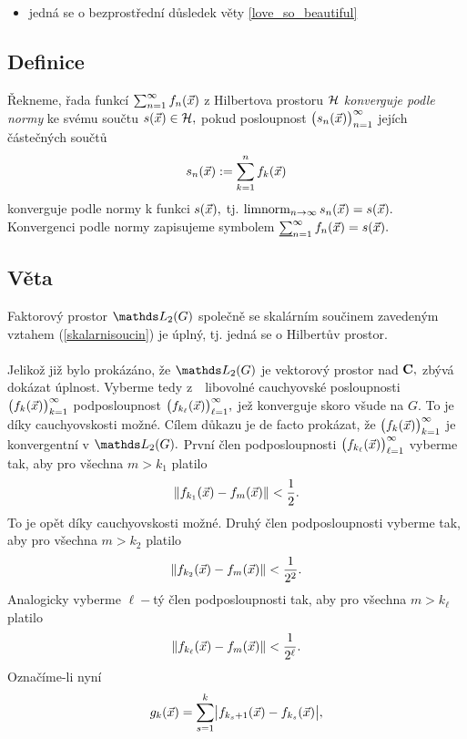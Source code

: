 \Proof

\begin{itemize}
\item jedn\'a se o bezprost\v redn\'i d\r usledek v\v ety \ref{love_so_beautiful}
\end{itemize}

\subsection{Definice}\label{kosta}

\v Rekneme, \v rada funkc\'i $\sum_{n=1}^\infty f_n({\vec{x}})$ z Hilbertova prostoru ${\mathcal H}$ \emph{konverguje podle normy} ke sv\'emu sou\v ctu $s({\vec{x}})\in{\mathcal H},$ pokud posloupnost  $\bigl(s_n({\vec{x}})\bigr)_{n=1}^\infty$ jej\'ich \v c\'aste\v cn\'ych sou\v ct\r u
%
$$s_n({\vec{x}}):=\sum_{k=1}^n f_k({\vec{x}})$$
%
konverguje podle normy k funkci $s({\vec{x}}),$ tj. $\mathop{\mathrm{limnorm}}_{n\rightarrow \infty} s_n({\vec{x}})=s({\vec{x}}).$ Konvergenci podle normy zapisujeme symbolem $\sumline_{n=1}^\infty f_n(\x) = s(\x).$ 



\subsection{V\v eta}

Faktorov\'y prostor $\LL_2(G)$ spole\v cn\v e se skal\'arn\'im
sou\v cinem zaveden\'ym vztahem (\ref{skalarnisoucin}) je \'upln\'y, tj. jedn\'a se o Hilbert\r uv prostor.\\

\Proof\\

Jeliko\v z ji\v z bylo prok\'az\'ano, \v ze $\LL_2(G)$ je
vektorov\'y prostor nad ${\mathbf C},$ zb\'yv\'a dok\'azat \'uplnost.
Vyberme tedy z~~libovoln\'e cauchyovsk\'e posloupnosti
$\bigl(f_k({\vec{x}})\bigr)_{k=1}^\infty$ podposloupnost
$\bigl(f_{k_\ell}({\vec{x}})\bigr)_{\ell=1}^\infty,$ je\v z konverguje
skoro v\v sude na $G.$ To je d\'iky cauchyovskosti mo\v zn\'e.
C\'ilem d\r ukazu je de facto prok\'azat, \v ze
$\bigl(f_k({\vec{x}})\bigr)_{k=1}^\infty$ je konvergentn\'i v
$\LL_2(G).$ Prvn\'i \v clen podposloupnosti
$\bigl(f_{k_\ell}({\vec{x}})\bigr)_{\ell=1}^\infty$ vyberme tak, aby pro
v\v sechna $m>k_1$ platilo
%
$$\|f_{k_1}({\vec{x}})-f_m({\vec{x}})\| < \frac{1}{2}.$$
%
To je op\v et d\'iky cauchyovskosti mo\v zn\'e. Druh\'y \v clen podposloupnosti vyberme tak,
aby pro v\v sechna $m>k_2$ platilo
%
$$\|f_{k_2}({\vec{x}})-f_m({\vec{x}})\| < \frac{1}{2^2}.$$
%
Analogicky vyberme $\ell-$t\'y \v clen podposloupnosti tak, aby
pro v\v sechna $m>k_\ell$ platilo
%
$$\|f_{k_\ell}({\vec{x}})-f_m({\vec{x}})\| < \frac{1}{2^\ell}.$$
%
Ozna\v c\'ime-li nyn\'i
%
$$g_k({\vec{x}})=\sum_{s=1}^k \bigl|f_{k_s+1}({\vec{x}})-f_{k_s}({\vec{x}})\bigr|,$$

